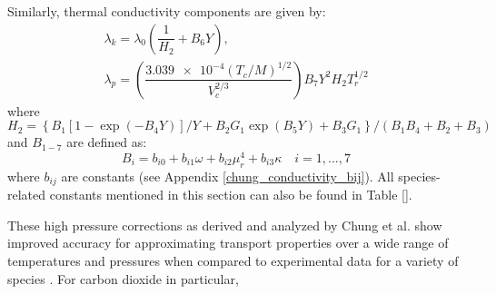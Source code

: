 Similarly, thermal conductivity components are given by: 
\begin{equation}
\begin{split}
\lambda_k = \lambda_0 \left( \dfrac{1}{H_2} + B_6 Y \right), \\ 
\lambda_p = \left(\dfrac{\num{3.039e-4}(T_c/M)^{1/2}}{V_c^{2/3}}\right)B_7Y^2H_2T_r^{1/2} 
\end{split}
\end{equation}
where $H_2 = \left\{B_1\left[   1-\exp(-B_4Y)\right]/Y + B_2G_1\exp(B_5Y) + B_3G_1 \right\}/(B_1B_4 + B_2 + B_3)$ and $B_{1-7}$ are defined as: 
\begin{equation}
B_i = b_{i0} + b_{i1} \omega + b_{i2} \mu_r^4 + b_{i3} \kappa \quad i = 1,..., 7
\end{equation}
where $b_{ij}$ are constants (see Appendix \ref{chung_conductivity_bij}). All species-related constants mentioned in this section can also be found in Table \ref{}. 

These high pressure corrections as derived and analyzed by Chung et al. show improved accuracy for approximating transport properties over a wide range of temperatures and pressures when compared to experimental data for a variety of species \cite{chung:1988}. For carbon dioxide in particular,  

